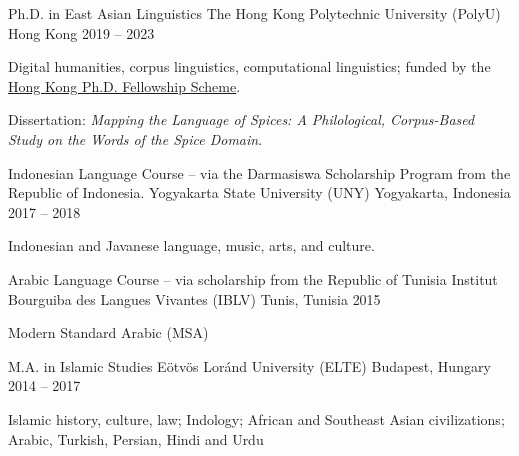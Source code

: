 
\begin{cventries}

  \cventry
    {Ph.D. in East Asian Linguistics} %
    {The Hong Kong Polytechnic University (PolyU)} %
    {Hong Kong} %
    {2019 -- 2023} %
    {
      \begin{cvitems} %
        \item {Digital humanities, corpus linguistics, computational linguistics; funded by the \href{https://cerg1.ugc.edu.hk/hkpfs/index.html}{Hong Kong Ph.D. Fellowship Scheme}.}
        \item {Dissertation: \textit{Mapping the Language of Spices: A Philological, Corpus-Based Study on the Words of the Spice Domain}. \href{https://partigabor.github.io/spice}{\faPaperclip}}
      \end{cvitems}
    }

  \cventry
    {Indonesian Language Course -- via the Darmasiswa Scholarship Program from the Republic of Indonesia.} %
    {Yogyakarta State University (UNY)} %
    {Yogyakarta, Indonesia} %
    {2017 -- 2018} %
    {
      \begin{cvitems} %
        \item {Indonesian and Javanese language, music, arts, and culture.}
      \end{cvitems}
    }

  \cventry
    {Arabic Language Course -- via scholarship from the Republic of Tunisia} %
    {Institut Bourguiba des Langues Vivantes (IBLV)} %
    {Tunis, Tunisia} %
    {2015} %
    {
      \begin{cvitems} %
        \item {Modern Standard Arabic (MSA)}
      \end{cvitems}
    }
    
  \cventry
    {M.A. in Islamic Studies} %
    {Eötvös Loránd University (ELTE)} %
    {Budapest, Hungary} %
    {2014 -- 2017} %
    {
      \begin{cvitems} %
        \item {Islamic history, culture, law; Indology; African and Southeast Asian civilizations; Arabic, Turkish, Persian, Hindi and Urdu}
      \end{cvitems}
    }


\end{cventries}
